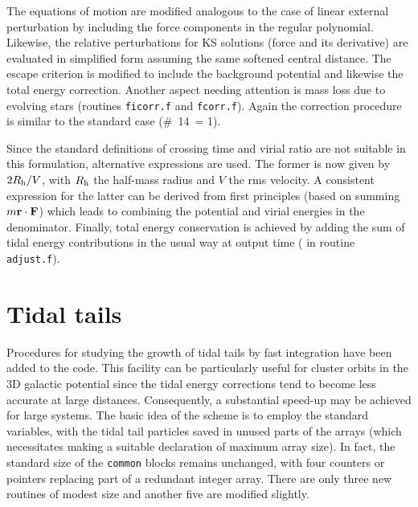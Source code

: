 \documentclass[12pt]{article}
\begin{document}
The equations of motion are modified analogous to the case of linear
external perturbation by including the force components in the regular
polynomial.
Likewise, the relative perturbations for KS solutions (force and its
derivative) are evaluated in simplified form assuming the same softened
central distance.
The escape criterion is modified to include the background potential
and likewise the total energy correction.
Another aspect needing attention is mass loss due to evolving stars
(routines {\tt ficorr.f} and {\tt fcorr.f}).
Again the correction procedure is similar to the standard case
(\#~14~= 1).

Since the standard definitions of crossing time and virial ratio are
not suitable in this formulation, alternative expressions are used.
The former is now given by $2 R_{\rm h}/V$, with $R_{\rm h}$ the
half-mass radius and $V$ the rms velocity.
A consistent expression for the latter can be derived from first principles
(based on summing $m {\bf r} \cdot {\bf F}$) which leads to combining the
potential and virial energies in the denominator.
Finally, total energy conservation is achieved by adding the sum of tidal
energy contributions in the usual way at output time ( in
routine {\tt adjust.f}).

\section{Tidal tails}

Procedures for studying the growth of tidal tails by fast integration have
been added to the code.
This facility can be particularly useful for cluster orbits in the 3D
galactic potential since the tidal energy corrections tend to become
less accurate at large distances.
Consequently, a substantial speed-up may be achieved for large systems.
The basic idea of the scheme is to employ the standard variables, with
the tidal tail particles saved in unused parts of the arrays (which
necessitates making a suitable declaration of maximum array size).
In fact, the standard size of the {\tt common} blocks remains unchanged,
with four counters or pointers replacing part of a redundant integer array.
There are only three new routines of modest size and another five are
modified slightly.
\end{document}
